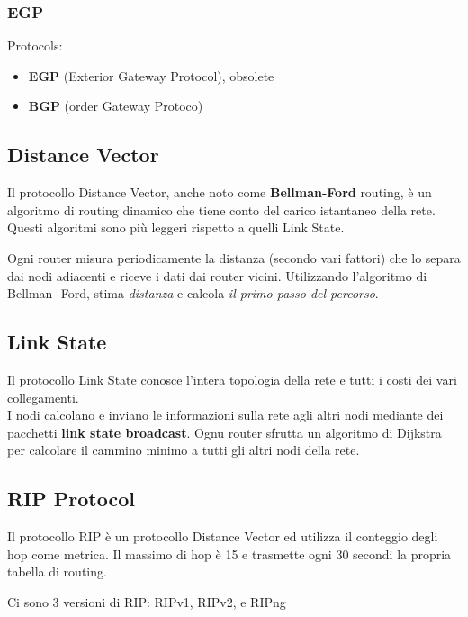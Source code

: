 \documentclass{article}
\begin{document}
\subsubsection{EGP}

Protocols:

\begin{itemize}
    \item \textbf{EGP} (Exterior Gateway Protocol), obsolete
    \item \textbf{BGP} (order Gateway Protoco)
\end{itemize}

\subsection{Distance Vector}

Il protocollo Distance Vector, anche noto come \textbf{Bellman-Ford} routing, è un
algoritmo di routing dinamico che tiene conto del carico istantaneo della rete.
Questi algoritmi sono più leggeri rispetto a quelli Link State.

Ogni router misura periodicamente la distanza (secondo vari fattori) che lo
separa dai nodi adiacenti e riceve i dati dai router vicini. Utilizzando l'algoritmo di Bellman-
Ford, stima \textit{distanza} e calcola \textit{il primo passo del percorso}.

\subsection{Link State}

Il protocollo Link State conosce l'intera topologia della rete e tutti i costi dei vari collegamenti.
\\
I nodi calcolano e inviano le informazioni sulla rete agli altri nodi mediante dei pacchetti
\textbf{link state broadcast}.
Ognu router sfrutta un algoritmo di Dijkstra per calcolare il cammino minimo a tutti gli altri nodi
della rete.

\subsection{RIP Protocol}

Il protocollo RIP è un protocollo Distance Vector ed utilizza il conteggio degli hop
come metrica. Il massimo di hop è 15 e trasmette ogni 30 secondi la propria tabella di routing.

Ci sono 3 versioni di RIP: RIPv1, RIPv2, e RIPng
\end{document}
